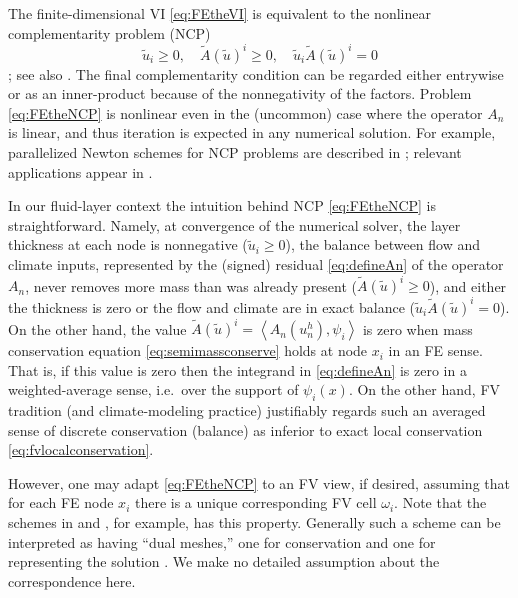 \documentclass[final,onefignum]{siamart190516}
\newcommand{\ip}[2]{\ensuremath{\left<#1,#2\right>}}
\begin{document}
The finite-dimensional VI \eqref{eq:FEtheVI} is equivalent to the nonlinear complementarity problem (NCP)
\begin{equation}
\tilde u_i \ge 0, \quad \tilde A(\tilde u)^i \ge 0, \quad \tilde u_i \tilde A(\tilde u)^i = 0 \label{eq:FEtheNCP}
\end{equation}
\cite[Theorem I.5.5]{KinderlehrerStampacchia1980}; see also \cite{FacchineiPang2003}.  The final complementarity condition can be regarded either entrywise or as an inner-product because of the nonnegativity of the factors.  Problem \eqref{eq:FEtheNCP} is nonlinear even in the (uncommon) case where the operator $A_n$ is linear, and thus iteration is expected in any numerical solution.  For example, parallelized Newton schemes for NCP problems are described in \cite{BensonMunson2006}; relevant applications appear in \cite{Brinkerhoffetal2017,Bueler2016}.

In our fluid-layer context the intuition behind NCP \eqref{eq:FEtheNCP} is straightforward.  Namely, at convergence of the numerical solver, the layer thickness at each node is nonnegative ($\tilde u_i \ge 0$), the balance between flow and climate inputs, represented by the (signed) residual \eqref{eq:defineAn} of the operator $A_n$, never removes more mass than was already present ($\tilde A(\tilde u)^i \ge 0$), and either the thickness is zero or the flow and climate are in exact balance ($\tilde u_i \tilde A(\tilde u)^i = 0$).  On the other hand, the value $\tilde A(\tilde u)^i = \ip{A_n(u_n^h)}{\psi_i}$ is zero when mass conservation equation \eqref{eq:semimassconserve} holds at node $x_i$ in an FE sense.  That is, if this value is zero then the integrand in \eqref{eq:defineAn} is zero in a weighted-average sense, i.e.~over the support of $\psi_i(x)$.  On the other hand, FV tradition (and climate-modeling practice) justifiably regards such an averaged sense of discrete conservation (balance) as inferior to exact local conservation \eqref{eq:fvlocalconservation}.

However, one may adapt \eqref{eq:FEtheNCP} to an FV view, if desired, assuming that for each FE node $x_i$ there is a unique corresponding FV cell $\omega_i$.  Note that the schemes in \cite{Bueler2016} and \cite{EwingLinLin2002}, for example, has this property.  Generally such a scheme can be interpreted as having ``dual meshes,'' one for conservation and one for representing the solution \cite{Ringleretal2013}.  We make no detailed assumption about the correspondence here.
\end{document}
